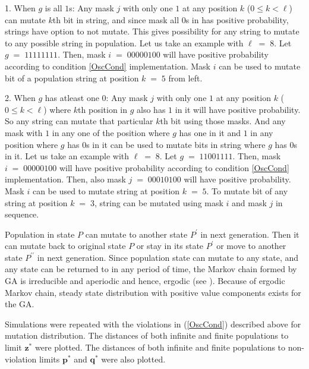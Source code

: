 1. When $g$ is all $1$s:\newline
Any mask $j$ with only one $1$ at any position $k$ ($0 \leq k < \ell$) can mutate $k$th bit in string, and since mask 
all $0$s in has positive probability, strings have option to not mutate. This gives possibility for any string to mutate to 
any possible string in population. Let us take an example with $\ell \;=\; 8$. Let $g \;=\; 11111111$. Then, mask 
$i \;=\; 00000100$ will have positive probability according to condition \ref{OscCond} implementation. 
Mask $i$ can be used to mutate bit of a population string at position $k \;=\; 5$ from left.

2. When $g$ has atleast one $0$:\newline
Any mask $j$ with only one $1$ at any position $k$ ($0 \leq k < \ell$) where $k$th position in $g$ also has $1$ in it 
will have positive probability. So any string can mutate that particular $k$th bit using those masks. And any mask 
with $1$ in any one of the position where $g$ has one in it and $1$ in any position where $g$ has $0$s in it can be used to 
mutate bits in string where $g$ has $0$s in it. Let us take an example with $\ell \;=\; 8$. Let $g \;=\; 11001111$. Then, 
mask $i \;=\; 00000100$ will have positive probability according to condition \ref{OscCond} implementation. Then, also mask 
$j \;=\; 00010100$ will have positive probability. Mask $i$ can be used to mutate string at position $k \;=\; 5$. 
To mutate bit of any string at position $k \;=\; 3$, string can be mutated using mask $i$ and mask $j$ in sequence.

Population in state $P$ can mutate to another state $P^\prime$ in next generation. Then it can mutate back to original state $P$ or 
stay in its state $P^\prime$ or move to another state $P^{\prime\prime}$ in next generation. Since population state can mutate to 
any state, and any state can be returned to in any period of time, the Markov chain formed by GA is irreducible and aperiodic and hence, 
ergodic (see \cite{MarkovChain}). Because of ergodic Markov chain, steady state distribution with positive value components exists for the GA.   

Simulations were repeated with the violations in (\ref{OscCond}) described above for mutation distribution.
The distances of both infinite and finite populations to limit $\bm{z}^\ast$ were plotted. 
The distances of both infinite and finite populations to non-violation limits $\bm{p}^\ast$ and $\bm{q}^\ast$ were also plotted.

